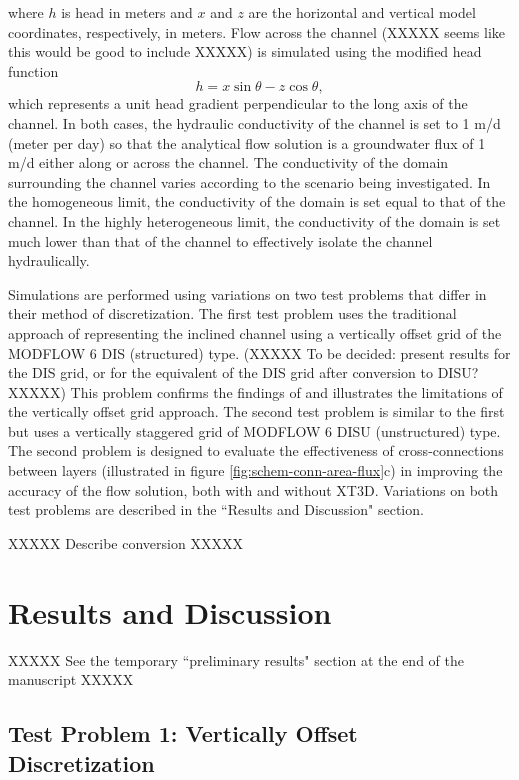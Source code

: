 \documentclass{article}
\begin{document}
\noindent where $h$ is head in meters and $x$ and $z$ are the horizontal and vertical model coordinates, respectively, in meters. Flow across the channel (XXXXX seems like this would be good to include XXXXX) is simulated using the modified head function
\begin{equation}
\label{eqn:head_analyt_across}
h = x \sin \theta - z \cos \theta,
\end{equation}
which represents a unit head gradient perpendicular to the long axis of the channel. In both cases, the hydraulic conductivity of the channel is set to 1 m/d (meter per day) so that the analytical flow solution is a groundwater flux of 1 m/d either along or across the channel. The conductivity of the domain surrounding the channel varies according to the scenario being investigated. In the homogeneous limit, the conductivity of the domain is set equal to that of the channel. In the highly heterogeneous limit, the conductivity of the domain is set much lower than that of the channel to effectively isolate the channel hydraulically.

Simulations are performed using variations on two test problems that differ in their method of discretization. The first test problem uses the traditional approach of representing the inclined channel using a vertically offset grid of the MODFLOW 6 DIS (structured) type. (XXXXX To be decided: present results for the DIS grid, or for the equivalent of the DIS grid after conversion to DISU? XXXXX) This problem confirms the findings of \cite{bardot2022} and illustrates the limitations of the vertically offset grid approach. The second test problem is similar to the first but uses a vertically staggered grid of MODFLOW 6 DISU (unstructured) type. The second problem is designed to evaluate the effectiveness of cross-connections between layers (illustrated in figure \ref{fig:schem-conn-area-flux}c) in improving the accuracy of the flow solution, both with and without XT3D. Variations on both test problems are described in the ``Results and Discussion" section.

XXXXX Describe conversion XXXXX

\section{Results and Discussion}

XXXXX See the temporary ``preliminary results" section at the end of the manuscript XXXXX

\subsection{Test Problem 1: Vertically Offset Discretization}
\end{document}
